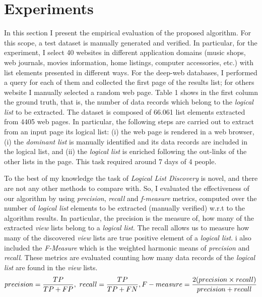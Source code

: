 \section{Experiments}
In this section I present the empirical evaluation of the proposed algorithm. For this scope, a test dataset is manually generated and verified. In particular, for the experiment, I select 40 websites in different application domains (music shops, web journals, movies information, home listings, computer accessories, etc.) with list elements presented in different ways. For the deep-web databases, I performed a query for each of them and collected the first page of the results list;  for others website I manually selected a random web page. Table 1 shows in the first column the ground truth, that is, the number of data records which belong to the \textit{logical list} to be extracted.
The dataset is composed of 66.061 list elements extracted from 4405 web pages. In particular, the following steps are carried out to extract from an input page its logical list: (i)  the web page is rendered in a web browser, (i) the \emph{dominant list} is manually identified and its data records are included in the logical list, and (ii) the \emph{logical list} is enriched following the out-links of the other lists in the page. This task required around 7 days of 4 people.



To the best of my knowledge the task of \emph{Logical List Discovery} is novel, and there are not any other methods to compare with. So, I evaluated the effectiveness of our algorithm by using \emph{precision}, \emph{recall} and \emph{f-measure} metrics, computed over the number of \emph{logical list} elements to be extracted (manually verified) w.r.t to the algorithm results. In particular, the precision is the measure of, how many of the extracted \emph{view} lists belong to a \emph{logical list}. The recall allows us to measure how many of the discovered \emph{view} lists are true positive element of a \emph{logical list}. i also included the \emph{F-Measure} which is the weighted harmonic means of \emph{precision} and \emph{recall}. 
These metrics are evaluated counting how many data records of the \emph{logical list} are found in the \emph{view} lists.
\begin{equation}
precision= \frac{TP}{TP + FP},~
recall= \frac{TP}{TP + FN},\\
F-measure= \frac{2(precision \times recall)}{precision + recall}
\end{equation} 

